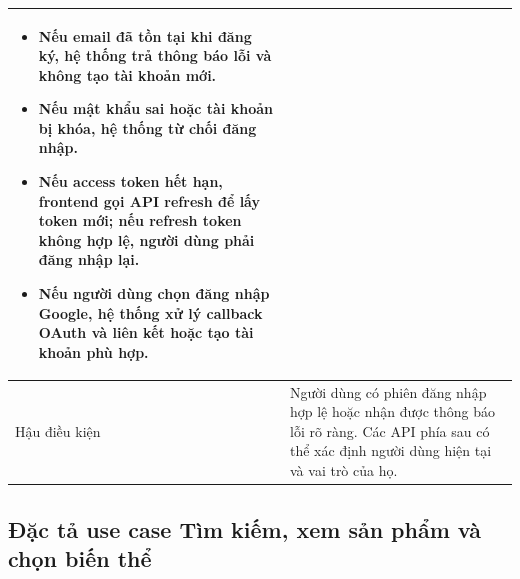 \documentclass[../DoAn.tex]{subfiles}
\begin{document}
{\begin{longtable}{|p{3.2cm}|p{10.4cm}|}
\begin{minipage}[t]{10.1cm}
\begin{itemize}[leftmargin=*,topsep=0pt,itemsep=0pt]
    \item Nếu email đã tồn tại khi đăng ký, hệ thống trả thông báo lỗi và không tạo tài khoản mới.
    \item Nếu mật khẩu sai hoặc tài khoản bị khóa, hệ thống từ chối đăng nhập.
    \item Nếu access token hết hạn, frontend gọi API refresh để lấy token mới; nếu refresh token không hợp lệ, người dùng phải đăng nhập lại.
    \item Nếu người dùng chọn đăng nhập Google, hệ thống xử lý callback OAuth và liên kết hoặc tạo tài khoản phù hợp.
\end{itemize}
\end{minipage} \\ \hline
Hậu điều kiện & Người dùng có phiên đăng nhập hợp lệ hoặc nhận được thông báo lỗi rõ ràng. Các API phía sau có thể xác định người dùng hiện tại và vai trò của họ. \\ \hline
\end{longtable}
}

\subsection{Đặc tả use case Tìm kiếm, xem sản phẩm và chọn biến thể}
\label{subsection:2.3.2}
\end{document}
